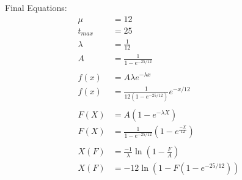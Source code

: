 \documentclass[12pt]{article}
\begin{document}
Final Equations:
\begin{align*}
	\mu &= 12 \\
	t_{max} &= 25 \\
	\lambda &= \frac{1}{12} \\
	A &= \frac{1}{1 - e^{-25/12}} \\
	\\
	f(x) &= A \lambda e^{-\lambda x} \\
	f(x) &= \frac{1}{12 (1 - e^{-25/12})} e^{-x/12} \\
	\\
	F(X) &= A\left(1 - e^{-\lambda X}\right) \\
	F(X) &= \frac{1}{1 - e^{-25/12}}\left(1 - e^{\frac{-X}{12}}\right) \\
	\\
	X(F) &= \frac{-1}{\lambda}\ln\left(1 - \frac{F}{A}\right) \\
	X(F) &= -12 \ln\left(1 - F(1 - e^{-25/12})\right) \\
\end{align*}
\end{document}
